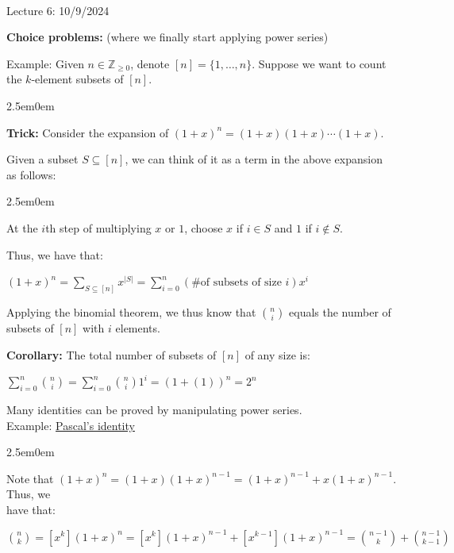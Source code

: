 \documentclass{book}
\newcommand{\hTwo}{%
\color{MidnightBlue}%
   \fontsize{13}{15}\selectfont%
}
\newcommand{\hThree}{%
   \color{PineGreen!85!Orange}
   \fontsize{12}{14}\selectfont%
}
\newenvironment{myIndent}{%
   \begin{adjustwidth}{2.5em}{0em}%
}{%
   \end{adjustwidth}%
}
\newcommand{\udefine}[1]{{%
   \setulcolor{Red}%
   \setul{0.14em}{0.07em}%
   \ul{#1}%
}}
\newcommand{\blab}[1]{\textbf{#1}}
\newcommand{\mySepTwo}[1][.]{%
   {\noindent\color{#1}{\rule{6.5in}{0.5mm}}}\\%
}
\newcommand{\retTwo}{\hfill\bigbreak}
\newcommand{\mHeader}[1]{{
   \color{Black}%
   \fontsize{20}{18}\selectfont%
   #1\retTwo
}}
\begin{document}
\mySepTwo

\mHeader{Lecture 6: 10/9/2024}

\blab{Choice problems:} (where we finally start applying power series)\retTwo

Example: Given $n \in \mathbb{Z}_{\geq 0}$, denote $[n] = \{1, \ldots, n\}$. Suppose we want to count\\ the $k$-element subsets of $[n]$.

\begin{myIndent}\hTwo
   \blab{Trick:} Consider the expansion of $(1+x)^n = (1+x)(1+x)\cdots(1+x)$.\retTwo

   Given a subset $S \subseteq [n]$, we can think of it as a term in the above expansion\\ as follows:
   
   \begin{myIndent}\hThree
      At the $i$th step of multiplying $x$ or $1$, choose $x$ if $i \in S$ and $1$ if $i \notin S$.\retTwo
   \end{myIndent}

   Thus, we have that:

   {\centering $(1 + x)^n = \sum\limits_{S \subseteq [n]}x^{|S|} = \sum\limits_{i=0}^n (\text{\# of subsets of size } i)x^i$ \retTwo\par}

   Applying the binomial theorem, we thus know that $\binom{n}{i}$ equals the number of\\ subsets of $[n]$ with $i$ elements.\retTwo

   \blab{Corollary:} The total number of subsets of $[n]$ of any size is:

   {\centering $\sum\limits_{i=0}^n \binom{n}{i} = \sum\limits_{i=0}^n \binom{n}{i}1^i = (1 + (1))^n = 2^n$ \retTwo\par}
\end{myIndent}

Many identities can be proved by manipulating power series.\\ Example: \udefine{Pascal's identity}

\begin{myIndent}\hTwo
   Note that $(1 + x)^n = (1+x)(1+x)^{n-1} = (1+x)^{n-1} + x(1+x)^{n-1}$. Thus, we\\ have that:

   {\center $\binom{n}{k} = [x^k](1+x)^n = [x^k](1+x)^{n-1}+[x^{k-1}](1+x)^{n-1} = \binom{n-1}{k} + \binom{n-1}{k-1}$ \newpage\par}
\end{myIndent}
\end{document}
